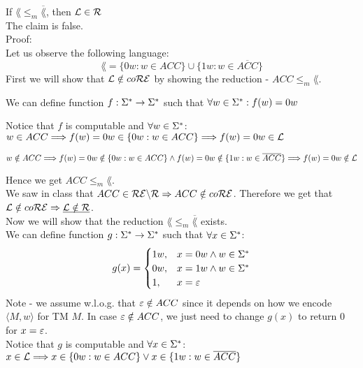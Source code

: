 If $\lang \leq_m \overline{\lang}$, then $\mathcal{L} \in \mathcal{R}$ \\
The claim is false. \\

Proof: \\
Let us observe the following language:
\[
    \lang = \{0w: w \in ACC\} \cup \{1w: w \in \overline{ACC}\}
\]
First we will show that $\mathcal{L} \notin co\mathcal{R}\mathcal{E}$ by showing the reduction - $ACC \leq_m \lang$.

We can define function $f: \Sigma^* \rightarrow \Sigma^*$ such that $\forall w \in \Sigma^*: f(w) = 0w$

Notice that $f$ is computable and $\forall w \in \Sigma^*$: \\
$w \in ACC \\
    \Longrightarrow f(w) = 0w \in \{0w: w \in ACC\} \\
    \Longrightarrow f(w) = 0w \in \mathcal{L}$

$w \notin ACC \\
    \Longrightarrow f(w) = 0w \notin \{0w: w \in ACC\} \wedge f(w) = 0w \notin \{1w: w \in \overline{ACC}\} \\
    \Longrightarrow f(w) = 0w \notin \mathcal{L}$

Hence we get $ACC \leq_m \lang$. \\
We saw in class that $ACC \in \mathcal{R}\mathcal{E} \backslash \mathcal{R} \Rightarrow ACC \notin co\mathcal{R}\mathcal{E}$.
Therefore we get that $\mathcal{L} \notin co\mathcal{R}\mathcal{E} \Rightarrow \underline{\mathcal{L} \notin \mathcal{R}}$. \\

Now we will show that the reduction $\lang \leq_m \overline{\lang}$ exists. \\
We can define function $g: \Sigma^* \rightarrow \Sigma^*$ such that $\forall x \in \Sigma^*$:
\[
    g(x) =
    \begin{cases}
        1w, & x = 0w \wedge w \in \Sigma^* \\
        0w, & x = 1w \wedge w \in \Sigma^* \\
        1,  & x = \varepsilon                 \\
    \end{cases}
\]
Note - we assume w.l.o.g. that $\varepsilon \notin ACC$ since it depends on
how we encode $\langle M, w \rangle$ for TM $M$.
In case $\varepsilon \notin ACC$, we just need to change $g(x)$ to return $0$ for $x = \varepsilon$. \\

Notice that $g$ is computable and $\forall x \in \Sigma^*$: \\
$x \in \mathcal{L} \\
    \Longrightarrow x \in \{0w: w \in ACC\} \vee x \in \{1w: w \in \overline{ACC}\}$

